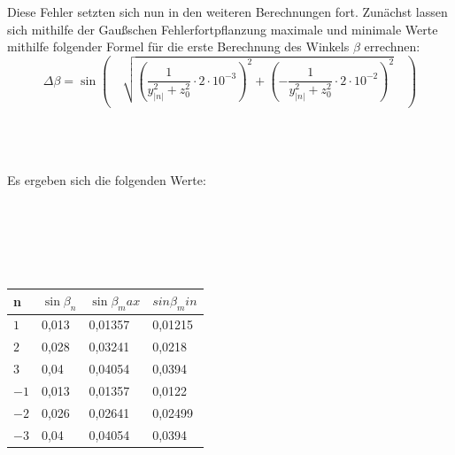\documentclass[12pt,a4paper,titlepage,headinclude,bibtotoc]{scrartcl}
\begin{document}
Diese Fehler setzten sich nun in den weiteren Berechnungen fort. Zunächst lassen sich mithilfe der Gaußschen Fehlerfortpflanzung maximale und minimale Werte mithilfe folgender Formel für die erste Berechnung des Winkels $\beta$ errechnen:\\

\begin{equation}
\Delta \beta = \sin( \quad \sqrt{({\dfrac{1}{y_{|n|}^{2}+z_{0}^{2}}} \cdot {{2} \cdot {10^{-3}}})^{2} + (- {\dfrac{1}{y_{|n|}^{2}+z_{0}^{2}}} \cdot {{2} \cdot {10^{-2}}})^{2}} \quad)
\end{equation}\\\\\

Es ergeben sich die folgenden Werte: \\\\\\\\\\\\
   
\par


\begin{table} [h]
\centering
\begin{tabular}{|p{2 cm}||p{3 cm}|p{3 cm}|p{3 cm}|}
		\hline
         n & $\sin\beta_n$  & $\sin\beta_max $ & $sin\beta_min$ \\
         \hline 
         $1 $& 0,013& 0,01357 & 0,01215 \\
         \hline
         $2 $& 0,028&  0,03241 &0,0218 \\
         \hline
         $3 $& 0,04& 0,04054& 0,0394\\
         \hline
         $-1$& 0,013&  0,01357& 0,0122 \\
         \hline
         $-2$& 0,026& 0,02641 & 0,02499 \\
         \hline             
         $-3$& 0,04& 0,04054  & 0,0394 \\
         \hline
\end{tabular}
\end{table}
\end{document}
